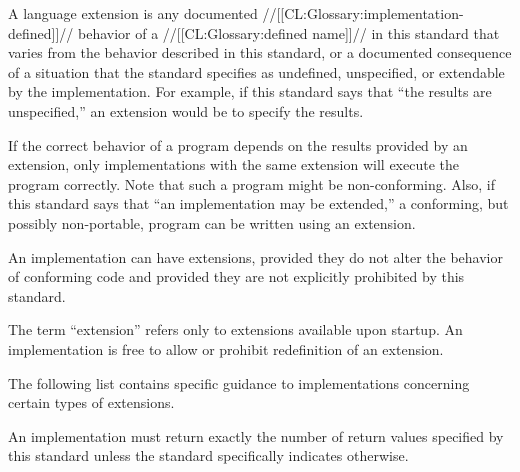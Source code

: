 


 
A language extension is any documented //[[CL:Glossary:implementation-defined]]// behavior
of a //[[CL:Glossary:defined name]]// in this standard that varies from the
behavior described in this standard, or a documented consequence of a
situation that the standard specifies as undefined, unspecified, or
extendable by the implementation.  For example, if this standard says
that ``the results are unspecified,'' an extension would be to specify
the results.

If the correct behavior of a program depends on the results provided
by an extension, only implementations with the same extension will
execute the program correctly.  Note that such a program might be
non-conforming.  Also, if this standard says that ``an implementation
may be extended,'' a conforming, but possibly non-portable, program
can be written using an extension.

An implementation can have extensions, provided they do not alter the
behavior of conforming code and provided they are not explicitly
prohibited by this standard.


          
The term ``extension'' refers only to extensions available upon
startup.  An implementation is free to allow or prohibit redefinition
of an extension.

The following list contains specific guidance to implementations 
concerning certain types of extensions.
\beginlist





 

































An implementation must return exactly
the number of return values specified by this standard unless the
standard specifically indicates otherwise.








